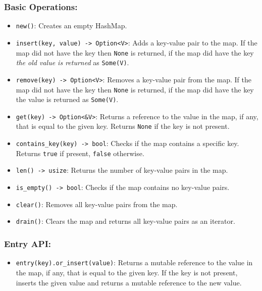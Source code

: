 \documentclass[
  11pt,
]{article}
\providecommand{\tightlist}{%
  \setlength{\itemsep}{0pt}\setlength{\parskip}{0pt}}
\begin{document}
\subsubsection{Basic Operations:}\label{basic-operations}

\begin{itemize}
\tightlist
\item
  \texttt{new()}: Creates an empty HashMap.
\item
  \texttt{insert(key,\ value)\ -\textgreater{}\ Option\textless{}V\textgreater{}}:
  Adds a key-value pair to the map. If the map did not have the key then
  \texttt{None} is returned, if the map did have the key \emph{the old
  value is returned} as \texttt{Some(V)}.
\item
  \texttt{remove(key)\ -\textgreater{}\ Option\textless{}V\textgreater{}}:
  Removes a key-value pair from the map. If the map did not have the key
  then \texttt{None} is returned, if the map did have the key the value
  is returned as \texttt{Some(V)}.
\item
  \texttt{get(key)\ -\textgreater{}\ Option\textless{}\&V\textgreater{}}:
  Returns a reference to the value in the map, if any, that is equal to
  the given key. Returns \texttt{None} if the key is not present.
\item
  \texttt{contains\_key(key)\ -\textgreater{}\ bool}: Checks if the map
  contains a specific key. Returns \texttt{true} if present,
  \texttt{false} otherwise.
\item
  \texttt{len()\ -\textgreater{}\ usize}: Returns the number of
  key-value pairs in the map.
\item
  \texttt{is\_empty()\ -\textgreater{}\ bool}: Checks if the map
  contains no key-value pairs.
\item
  \texttt{clear()}: Removes all key-value pairs from the map.
\item
  \texttt{drain()}: Clears the map and returns all key-value pairs as an
  iterator.
\end{itemize}

\subsubsection{Entry API:}\label{entry-api}

\begin{itemize}
\tightlist
\item
  \texttt{entry(key).or\_insert(value)}: Returns a mutable reference to
  the value in the map, if any, that is equal to the given key. If the
  key is not present, inserts the given value and returns a mutable
  reference to the new value.
\end{itemize}
\end{document}
